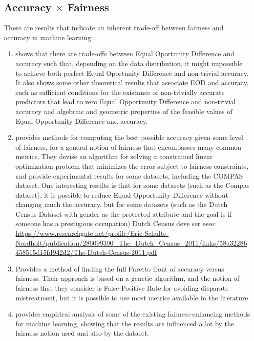 \subsection{Accuracy $\times$ Fairness}

There are results that indicate an inherent trade-off between fairness and accuracy in machine learning:

\begin{enumerate}
\item \cite{Carlos} shows that there are trade-offs between Equal Oportunity Difference and accuracy such that, depending on the data distribution, it might impossible to achieve both perfect Equal Oportunity Difference and non-trivial accuracy. It also shows some other theoretical results that associate EOD and accuracy, such as sufficient conditions for the existance of non-trivially accurate predictors that lead to zero Equal Opportunity Difference and non-trivial accuracy and algebraic and geometric properties of the feasible values of Equal Opportunity Difference and accuracy.
\item \cite{Reductions} provides methods for computing the best possible accuracy given some level of fairness, for a general notion of fairness that encompasses many common metrics. They devise an algorithm for solving a constrained linear optimization problem that minimizes the error subject to fairness constraints, and provide experimental results for some datasets, including the COMPAS \cite{Compass} dataset. One interesting results is that for some datasets (such as the Compas dataset), it is possible to reduce Equal Opportunity Difference without changing much the accuracy, but for some datasets (such as the Dutch Census Dataset\cite{Dutch} with gender as the protected attribute and the goal is if someone has a prestigious occupation) {\color{red} Dutch Census deve ser esse: \url{https://www.researchgate.net/profile/Eric-Schulte-Nordholt/publication/286099390_The_Dutch_Census_2011/links/58a3228b458515d15fd942d2/The-Dutch-Census-2011.pdf}}
\item \cite{How fair can we go in machine learning? Assessing the boundaries of accuracy and fairness} Provides a method of finding the full Paretto front of accuracy versus fairness. Their approach is based on a genetic algorithm, and the notion of fairness that they consider is False-Positive Rate for avoiding disparate mistreatment, but it is possible to use most metrics available in the literature.
\item \cite{A comparative study of fairness-enhancing interventions in machine learning} provides empirical analysis of some of the existing fairness-enhancing methods for machine learning, showing that the results are influenced a lot by the fairness notion used and also by the dataset.
\end{enumerate}


